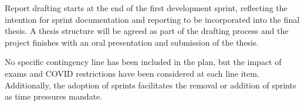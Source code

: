 \documentclass[11pt, parskip=half*,twoside=false]{scrbook}
\begin{document}
{Report drafting starts at the end of the first development sprint, reflecting the intention for sprint documentation and reporting to be incorporated into the final thesis. A thesis structure will be agreed as part of the drafting process and the project finishes with an oral presentation and submission of the thesis.

No specific contingency line has been included in the plan, but the impact of exams and COVID restrictions have been considered at each line item. Additionally, the adoption of sprints facilitates the removal or addition of sprints as time pressures mandate. 

\begin{landscape}	
	\begin{figure}


\end{figure}
\end{landscape}}
\end{document}
